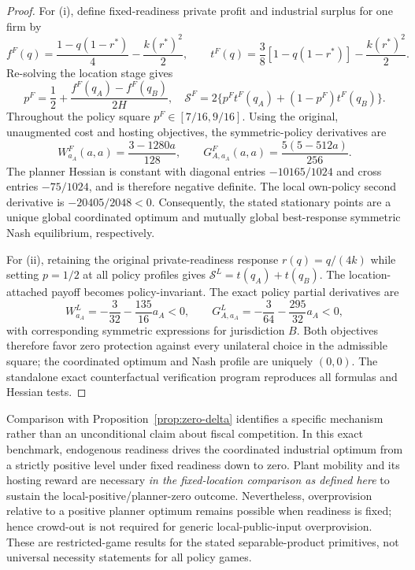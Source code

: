 \begin{proof}
For (i), define fixed-readiness private profit and industrial surplus
for one firm by
\[
f^F(q)=\frac{1-q(1-r^*)}{4}-\frac{k(r^*)^2}{2},
\qquad
t^F(q)=\frac38[1-q(1-r^*)]-\frac{k(r^*)^2}{2}.
\]
Re-solving the location stage gives
\[
p^F=\frac12+\frac{f^F(q_A)-f^F(q_B)}{2H},
\quad
\mathcal S^F=2\{p^F t^F(q_A)+(1-p^F)t^F(q_B)\}.
\]
Throughout the policy square $p^F\in[7/16,9/16]$.
Using the original, unaugmented cost and hosting objectives,
the symmetric-policy derivatives are
\[
W^F_{a_A}(a,a)=\frac{3-1280a}{128},
\qquad
G^F_{A,a_A}(a,a)=\frac{5(5-512a)}{256}.
\]
The planner Hessian is constant with diagonal entries
$-10165/1024$ and cross entries $-75/1024$, and is therefore
negative definite. The local own-policy second derivative is
$-20405/2048<0$. Consequently, the stated stationary points
are a unique global coordinated optimum and mutually global
best-response symmetric Nash equilibrium, respectively.

For (ii), retaining the original private-readiness response
$r(q)=q/(4k)$ while setting $p=1/2$ at all policy profiles
gives $\mathcal S^L=t(q_A)+t(q_B)$.
The location-attached payoff becomes policy-invariant. The exact
policy partial derivatives are
\[
W^L_{a_A}=-\frac3{32}-\frac{135}{16}a_A<0,
\qquad
G^L_{A,a_A}=-\frac3{64}-\frac{295}{32}a_A<0,
\]
with corresponding symmetric expressions for jurisdiction $B$.
Both objectives therefore favor zero protection against every
unilateral choice in the admissible square; the coordinated
optimum and Nash profile are uniquely $(0,0)$.
The standalone exact counterfactual verification program reproduces
all formulas and Hessian tests.
\end{proof}

Comparison with Proposition~\ref{prop:zero-delta} identifies a
specific mechanism rather than an unconditional claim about fiscal
competition. In this exact benchmark, endogenous readiness drives
the coordinated industrial optimum from a strictly positive level
under fixed readiness down to zero. Plant mobility and its hosting
reward are necessary \emph{in the fixed-location comparison as
defined here} to sustain the local-positive/planner-zero outcome.
Nevertheless, overprovision relative to a positive planner optimum
remains possible when readiness is fixed; hence crowd-out is not
required for generic local-public-input overprovision.
These are restricted-game results for the stated separable-product
primitives, not universal necessity statements for all policy games.
